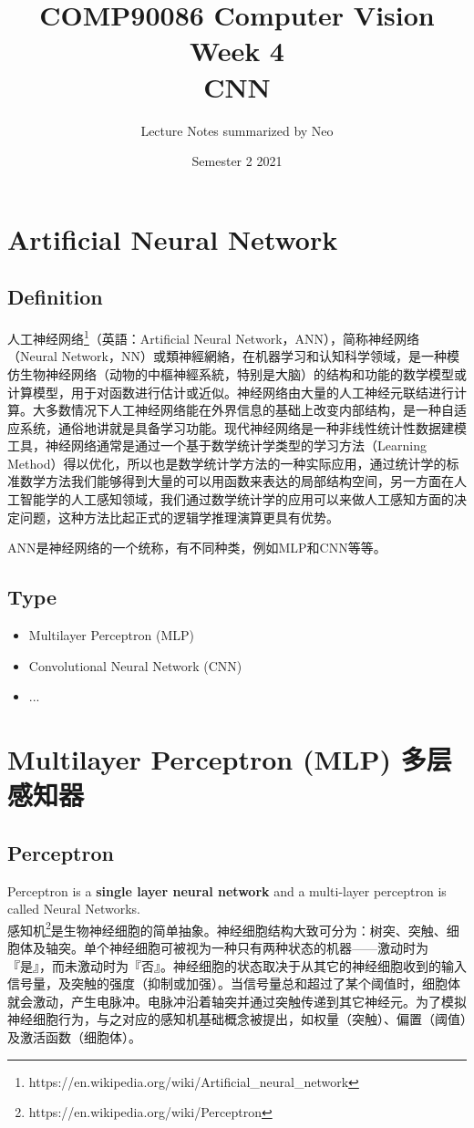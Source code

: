 \documentclass[11pt]{article}
\title{%
  \LARGE
  \textbf{COMP90086 Computer Vision \\
  \large Week 4
  \\
  CNN}}
\author{ Lecture Notes summarized by Neo }
\date{Semester 2 2021}
\begin{document}
\maketitle


\section{Artificial Neural Network}
\subsection{Definition}
人工神经网络\footnote{https://en.wikipedia.org/wiki/Artificial\_neural\_network}（英語：Artificial Neural Network，ANN），简称神经网络（Neural Network，NN）或類神經網絡，在机器学习和认知科学领域，是一种模仿生物神经网络（动物的中樞神經系統，特别是大脑）的结构和功能的数学模型或计算模型，用于对函数进行估计或近似。神经网络由大量的人工神经元联结进行计算。大多数情况下人工神经网络能在外界信息的基础上改变内部结构，是一种自适应系统，通俗地讲就是具备学习功能。现代神经网络是一种非线性统计性数据建模工具，神经网络通常是通过一个基于数学统计学类型的学习方法（Learning Method）得以优化，所以也是数学统计学方法的一种实际应用，通过统计学的标准数学方法我们能够得到大量的可以用函数来表达的局部结构空间，另一方面在人工智能学的人工感知领域，我们通过数学统计学的应用可以来做人工感知方面的决定问题，这种方法比起正式的逻辑学推理演算更具有优势。
\begin{framed}
  \begin{center}
    ANN是神经网络的一个统称，有不同种类，例如MLP和CNN等等。
  \end{center}
\end{framed}
\subsection{Type}
\begin{itemize}
  \item Multilayer Perceptron (MLP)
  \item Convolutional Neural Network (CNN)
  \item ...
\end{itemize}


\section{Multilayer Perceptron (MLP) 多层感知器}
\subsection{Perceptron}
Perceptron is a \textbf{single layer neural network} and a multi-layer perceptron is called Neural Networks.\\
感知机\footnote{https://en.wikipedia.org/wiki/Perceptron}是生物神经细胞的简单抽象。神经细胞结构大致可分为：树突、突触、细胞体及轴突。单个神经细胞可被视为一种只有两种状态的机器——激动时为『是』，而未激动时为『否』。神经细胞的状态取决于从其它的神经细胞收到的输入信号量，及突触的强度（抑制或加强）。当信号量总和超过了某个阈值时，细胞体就会激动，产生电脉冲。电脉冲沿着轴突并通过突触传递到其它神经元。为了模拟神经细胞行为，与之对应的感知机基础概念被提出，如权量（突触）、偏置（阈值）及激活函数（细胞体）。
\end{document}
